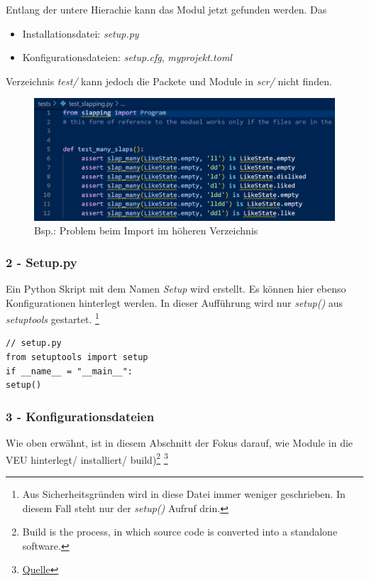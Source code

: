 Entlang der untere Hierachie kann das Modul jetzt gefunden werden. Das
\begin{itemize}
 \item Installationsdatei: \textit{setup.py}
	\item Konfigurationsdateien: \textit{setup.cfg}, \textit{myprojekt.toml}
\end{itemize} Verzeichnis \textit{test/} kann jedoch die Packete und Module in \textit{scr/} nicht finden.
\begin{figure}[H]
	\centering
	\includegraphics[scale = 0.8]{attachment/chapter_2/Scc071}
	\caption{Bsp.: Problem beim Import im höheren Verzeichnis}
\end{figure}

\subsubsection{2 - Setup.py}
Ein Python Skript mit dem Namen \textit{Setup} wird erstellt. Es können hier ebenso Konfigurationen hinterlegt werden. In dieser Aufführung wird nur \textit{setup()} aus \textit{setuptools} gestartet. \footnote{Aus Sicherheitsgründen wird in diese Datei immer weniger geschrieben. In diesem Fall steht nur der \textit{setup()} Aufruf drin.}
\begin{lstlisting}[style=python]
// setup.py
from setuptools import setup
if __name__ = "__main__":
setup()
\end{lstlisting}

\subsubsection{3 - Konfigurationsdateien}
Wie oben erwähnt, ist in diesem Abschnitt der Fokus darauf, wie Module in die \gls{VEU} hinterlegt/ installiert/ build)\footnote{
	Build is the process, in which source code is converted into a standalone software.
} \footnote{
	\href{https://setuptools.pypa.io/en/latest/userguide/pyproject_config.html}{Quelle}
}


